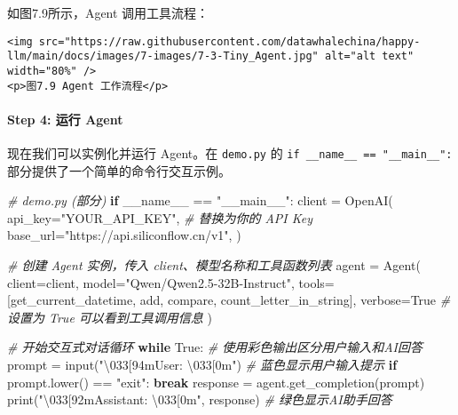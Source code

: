 \documentclass[
]{article}
\newenvironment{Shaded}{}{}
\newcommand{\BuiltInTok}[1]{\textcolor[rgb]{0.00,0.50,0.00}{#1}}
\newcommand{\CharTok}[1]{\textcolor[rgb]{0.25,0.44,0.63}{#1}}
\newcommand{\CommentTok}[1]{\textcolor[rgb]{0.38,0.63,0.69}{\textit{#1}}}
\newcommand{\ControlFlowTok}[1]{\textcolor[rgb]{0.00,0.44,0.13}{\textbf{#1}}}
\newcommand{\NormalTok}[1]{#1}
\newcommand{\OperatorTok}[1]{\textcolor[rgb]{0.40,0.40,0.40}{#1}}
\newcommand{\StringTok}[1]{\textcolor[rgb]{0.25,0.44,0.63}{#1}}
\newcommand{\VariableTok}[1]{\textcolor[rgb]{0.10,0.09,0.49}{#1}}
\begin{document}
如图7.9所示，Agent 调用工具流程：

\begin{verbatim}
<img src="https://raw.githubusercontent.com/datawhalechina/happy-llm/main/docs/images/7-images/7-3-Tiny_Agent.jpg" alt="alt text" width="80%" />
<p>图7.9 Agent 工作流程</p>
\end{verbatim}

\paragraph{Step 4: 运行 Agent}\label{step-4-ux8fd0ux884c-agent}

现在我们可以实例化并运行 Agent。在 \texttt{demo.py} 的
\texttt{if\ \_\_name\_\_\ ==\ "\_\_main\_\_":}
部分提供了一个简单的命令行交互示例。

\begin{Shaded}
\begin{Highlighting}[]
\CommentTok{\# demo.py (部分)}
\ControlFlowTok{if} \VariableTok{\_\_name\_\_} \OperatorTok{==} \StringTok{"\_\_main\_\_"}\NormalTok{:}
\NormalTok{    client }\OperatorTok{=}\NormalTok{ OpenAI(}
\NormalTok{        api\_key}\OperatorTok{=}\StringTok{"YOUR\_API\_KEY"}\NormalTok{, }\CommentTok{\# 替换为你的 API Key}
\NormalTok{        base\_url}\OperatorTok{=}\StringTok{"https://api.siliconflow.cn/v1"}\NormalTok{,}
\NormalTok{    )}

    \CommentTok{\# 创建 Agent 实例，传入 client、模型名称和工具函数列表}
\NormalTok{    agent }\OperatorTok{=}\NormalTok{ Agent(}
\NormalTok{        client}\OperatorTok{=}\NormalTok{client,}
\NormalTok{        model}\OperatorTok{=}\StringTok{"Qwen/Qwen2.5{-}32B{-}Instruct"}\NormalTok{,}
\NormalTok{        tools}\OperatorTok{=}\NormalTok{[get\_current\_datetime, add, compare, count\_letter\_in\_string],}
\NormalTok{        verbose}\OperatorTok{=}\VariableTok{True} \CommentTok{\# 设置为 True 可以看到工具调用信息}
\NormalTok{    )}

    \CommentTok{\# 开始交互式对话循环}
    \ControlFlowTok{while} \VariableTok{True}\NormalTok{:}
        \CommentTok{\# 使用彩色输出区分用户输入和AI回答}
\NormalTok{        prompt }\OperatorTok{=} \BuiltInTok{input}\NormalTok{(}\StringTok{"}\CharTok{\textbackslash{}033}\StringTok{[94mUser: }\CharTok{\textbackslash{}033}\StringTok{[0m"}\NormalTok{)  }\CommentTok{\# 蓝色显示用户输入提示}
        \ControlFlowTok{if}\NormalTok{ prompt.lower() }\OperatorTok{==} \StringTok{"exit"}\NormalTok{:}
            \ControlFlowTok{break}
\NormalTok{        response }\OperatorTok{=}\NormalTok{ agent.get\_completion(prompt)}
        \BuiltInTok{print}\NormalTok{(}\StringTok{"}\CharTok{\textbackslash{}033}\StringTok{[92mAssistant: }\CharTok{\textbackslash{}033}\StringTok{[0m"}\NormalTok{, response)  }\CommentTok{\# 绿色显示AI助手回答}
\end{Highlighting}
\end{Shaded}
\end{document}
